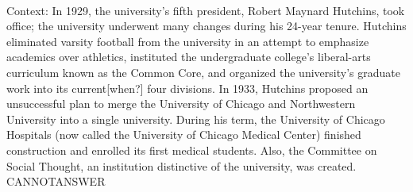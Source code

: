 \documentclass[11pt,a4paper, onecolumn]{article}
\begin{document}
\\ Context: In 1929, the university's fifth president, Robert Maynard Hutchins, took office; the university underwent many changes during his 24-year tenure. Hutchins eliminated varsity football from the university in an attempt to emphasize academics over athletics, instituted the undergraduate college's liberal-arts curriculum known as the Common Core, and organized the university's graduate work into its current[when?] four divisions. In 1933, Hutchins proposed an unsuccessful plan to merge the University of Chicago and Northwestern University into a single university. During his term, the University of Chicago Hospitals (now called the University of Chicago Medical Center) finished construction and enrolled its first medical students. Also, the Committee on Social Thought, an institution distinctive of the university, was created. CANNOTANSWER
\end{document}

